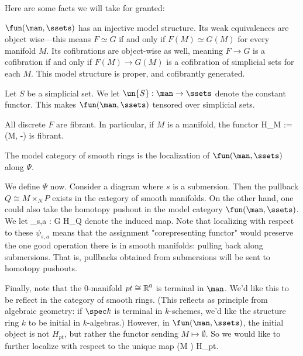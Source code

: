 Here are some facts we will take for granted:
\enum
	\item 
		$\fun(\man,\ssets)$ has an injective model structure. Its weak equivalences are object wise---this means $F \simeq G$ if and only if $F(M) \simeq G(M)$ for every manifold $M$. Its cofibrations are object-wise as well, meaning $F \to G$ is a cofibration if and only if $F(M) \to G(M)$ is a cofibration of simplicial sets for each $M$. This model structure is proper, and cofibrantly generated.
	\item
		Let $S$ be a simplicial set. We let $\un{S}: \man \to \ssets$ denote the constant functor. This makes $\fun(\man,\ssets)$ tensored over simplicial sets.
	\item
		All discrete $F$ are fibrant. In particular, if $M$ is a manifold, the functor
			\eqnn
			H_M := \man(M, -)
			\eqnd
		is fibrant.
\enumd

\begin{defn}
The model category of smooth rings is the localization of $\fun(\man,\ssets)$ along $\Psi$.
\end{defn}

We define $\Psi$ now.
Consider a diagram
	\eqnn
	\eqnd
where $s$ is a submersion. Then the pullback $Q \cong M \times_N P$ exists in the category of smooth manifolds. On the other hand, one could also take the homotopy pushout
	\eqnn
	\eqnd
in the model category $\fun(\man,\ssets)$. We let
	\eqnn
		\psi_{s,a} : G \to H_Q
	\eqnd 
denote the induced map. Note that localizing with respect to these $\psi_{s,a}$ means that the assignment "corepresenting functor" would preserve the one good operation there is in smooth manifolds: pulling back along submersions. That is, pullbacks obtained from submersions will be sent to homotopy pushouts.

Finally, note that the 0-manifold $pt \cong \mathbb R^0$ is terminal in $\man$. We'd like this to be reflect in the category of smooth rings. (This reflects as principle from algebraic geometry: if $\spec k$ is terminal in $k$-schemes, we'd like the structure ring $k$ to be initial in $k$-algebras.) However, in $\fun(\man,\ssets)$, the initial object is not $H_{pt}$, but rather the functor sending $M \mapsto \emptyset$. So we would like to further localize with respect to the unique map
	\eqnn
	 (M \mapsto \emptyset) \to H_{pt}.
	\eqnd 

